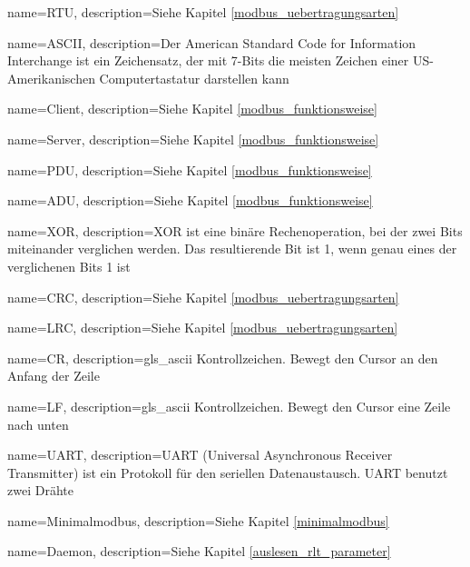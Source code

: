 {
	name=RTU,
	description={Siehe Kapitel \ref{modbus_uebertragungsarten} }
}

{
	name=ASCII,
	description={Der American Standard Code for Information Interchange ist ein Zeichensatz, der mit 7-Bits die meisten Zeichen einer US-Amerikanischen Computertastatur darstellen kann \cite{seo_kueche_ascii:o.J.}}
}

{
	name=Client,
	description={Siehe Kapitel \ref{modbus_funktionsweise} }
}

{
	name=Server,
	description={Siehe Kapitel \ref{modbus_funktionsweise} }
}

{
	name=PDU,
	description={Siehe Kapitel \ref{modbus_funktionsweise} }
}

{
	name=ADU,
	description={Siehe Kapitel \ref{modbus_funktionsweise} }
}

{
	name=XOR,
	description={XOR ist eine binäre Rechenoperation, bei der zwei Bits miteinander verglichen werden. Das resultierende Bit ist 1, wenn genau eines der verglichenen Bits 1 ist}
}

{
	name=CRC,
	description={Siehe Kapitel \ref{modbus_uebertragungsarten} }
}

{
	name=LRC,
	description={Siehe Kapitel \ref{modbus_uebertragungsarten} }
}

{
	name=CR,
	description={\gls{gls_ascii} Kontrollzeichen. Bewegt den Cursor an den Anfang der Zeile \cite{Mozilla_CRLF:2023}}
}

{
	name=LF,
	description={\gls{gls_ascii} Kontrollzeichen. Bewegt den Cursor eine Zeile nach unten \cite{Mozilla_CRLF:2023}}
}

{
	name=UART,
	description={UART (Universal Asynchronous Receiver Transmitter) ist ein Protokoll für den seriellen Datenaustausch. UART benutzt zwei Drähte \cite{rohde:o.J.}}
}

{
	name=Minimalmodbus,
	description={Siehe Kapitel \ref{minimalmodbus} }
}

{
	name=Daemon,
	description={Siehe Kapitel \ref{auslesen_rlt_parameter} }
}

